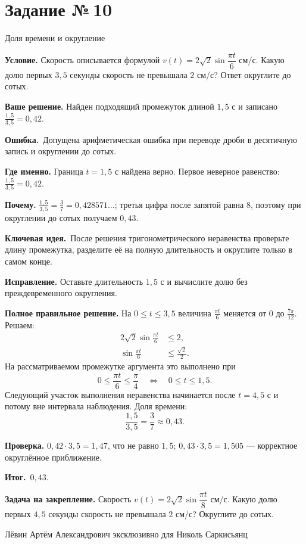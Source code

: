 \documentclass[a4paper,11pt]{article}
\newcommand{\Hdr}[1]{\par\vspace{2pt}\noindent\textbf{#1}\quad}
\newcommand{\E}{\par\smallskip\noindent\textcolor{errorred}{\textbf{Ошибка.}}\ }
\newcommand{\K}{\par\smallskip\noindent\textcolor{accent}{\textbf{Ключевая идея.}}\ }
\newcommand{\I}{\par\smallskip\noindent\textcolor{accent}{\textbf{Итог.}}\ }
\newcommand{\Task}[2]{\clearpage\phantomsection\label{task:#1}\section*{Задание №\,#1}\textcolor{accent}{#2}\par\vspace{7pt}}
\newcommand{\Footer}{\par\vfill\begin{center}\footnotesize\color{ink}Лёвин Артём Александрович эксклюзивно для Николь Саркисьянц\end{center}}
\begin{document}
\Task{10}{Доля времени и округление}
\Hdr{Условие.} Скорость описывается формулой $v(t)=2\sqrt2\sin\dfrac{\pi t}{6}$ см/с. Какую долю первых $3{,}5$ секунды скорость не превышала $2$ см/с? Ответ округлите до сотых.
\Hdr{Ваше решение.} Найден подходящий промежуток длиной $1{,}5$ с и записано $\frac{1{,}5}{3{,}5}=0{,}42$.
\E Допущена арифметическая ошибка при переводе дроби в десятичную запись и округлении до сотых.
\Hdr{Где именно.} Граница $t=1{,}5$ с найдена верно. Первое неверное равенство: $\frac{1{,}5}{3{,}5}=0{,}42$.
\Hdr{Почему.} $\frac{1{,}5}{3{,}5}=\frac37=0{,}428571\ldots$; третья цифра после запятой равна $8$, поэтому при округлении до сотых получаем $0{,}43$.
\K После решения тригонометрического неравенства проверьте длину промежутка, разделите её на полную длительность и округлите только в самом конце.
\Hdr{Исправление.} Оставьте длительность $1{,}5$ с и вычислите долю без преждевременного округления.
\Hdr{Полное правильное решение.} На $0\le t\le3{,}5$ величина $\frac{\pi t}{6}$ меняется от $0$ до $\frac{7\pi}{12}$. Решаем:
\[
\begin{aligned}
2\sqrt2\sin\frac{\pi t}{6}&\le2,\\
\sin\frac{\pi t}{6}&\le\frac{\sqrt2}{2}.
\end{aligned}
\]
На рассматриваемом промежутке аргумента это выполнено при
\[
0\le\frac{\pi t}{6}\le\frac\pi4
\quad\Longleftrightarrow\quad 0\le t\le1{,}5.
\]
Следующий участок выполнения неравенства начинается после $t=4{,}5$ с и потому вне интервала наблюдения. Доля времени:
\[\frac{1{,}5}{3{,}5}=\frac37\approx\boxed{0{,}43}.\]
\Hdr{Проверка.} $0{,}42\cdot3{,}5=1{,}47$, что не равно $1{,}5$; $0{,}43\cdot3{,}5=1{,}505$ --- корректное округлённое приближение.
\I $0{,}43$.
\Hdr{Задача на закрепление.} Скорость $v(t)=2\sqrt2\sin\dfrac{\pi t}{8}$ см/с. Какую долю первых $4{,}5$ секунды скорость не превышала $2$ см/с? Округлите до сотых.
\Footer
\end{document}
